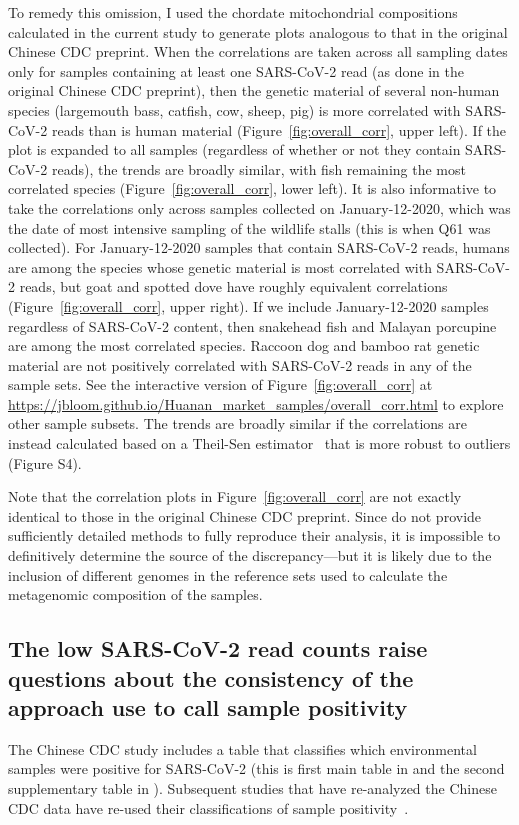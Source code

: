 \documentclass[9pt,twocolumn,twoside]{gsajnl_modified}
\begin{document}
To remedy this omission, I used the chordate mitochondrial compositions calculated in the current study to generate plots analogous to that in the original Chinese CDC preprint.
When the correlations are taken across all sampling dates only for samples containing at least one SARS-CoV-2 read (as done in the original Chinese CDC preprint), then the genetic material of several non-human species (largemouth bass, catfish, cow, sheep, pig) is more correlated with SARS-CoV-2 reads than is human material (Figure~\ref{fig:overall_corr}, upper left).
If the plot is expanded to all samples (regardless of whether or not they contain SARS-CoV-2 reads), the trends are broadly similar, with fish remaining the most correlated species (Figure~\ref{fig:overall_corr}, lower left).
It is also informative to take the correlations only across samples collected on January-12-2020, which was the date of most intensive sampling of the wildlife stalls (this is when Q61 was collected).
 For January-12-2020 samples that contain SARS-CoV-2 reads, humans are among the species whose genetic material is most correlated with SARS-CoV-2 reads, but goat and spotted dove have roughly equivalent correlations (Figure~\ref{fig:overall_corr}, upper right).
 If we include January-12-2020 samples regardless of SARS-CoV-2 content, then snakehead fish and Malayan porcupine are among the most correlated species.
Raccoon dog and bamboo rat genetic material are not positively correlated with SARS-CoV-2 reads in any of the sample sets.
See the interactive version of Figure~\ref{fig:overall_corr} at \url{https://jbloom.github.io/Huanan_market_samples/overall_corr.html} to explore other sample subsets.
The trends are broadly similar if the correlations are instead calculated based on a Theil-Sen estimator~\citep{theilsen} that is more robust to outliers (Figure S4).

Note that the correlation plots in Figure~\ref{fig:overall_corr} are not exactly identical to those in the original Chinese CDC preprint.
Since \citet{liu2022surveillance} do not provide sufficiently detailed methods to fully reproduce their analysis, it is impossible to definitively determine the source of the discrepancy---but it is likely due to the inclusion of different genomes in the reference sets used to calculate the metagenomic composition of the samples.

\subsection{The low SARS-CoV-2 read counts raise questions about the consistency of the approach use to call sample positivity}
The Chinese CDC study includes a table that classifies which environmental samples were positive for SARS-CoV-2 (this is first main table in \citet{liu2022surveillance} and the second supplementary table in \citet{liu2023surveillance}).
Subsequent studies that have re-analyzed the Chinese CDC data have re-used their classifications of sample positivity~\citep{worobey2022huanan,courtier2022sars,crits2023genetic}.
\end{document}
